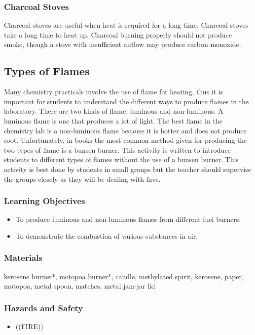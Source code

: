 \subsubsection{Charcoal Stoves}

Charcoal stoves are useful when heat is required for a long time. Charcoal stoves take a long time to heat up. Charcoal burning properly should not produce smoke, though a stove with insufficient airflow may produce carbon monoxide.

\subsection{Types of Flames}
Many chemistry practicals involve the use of flame for heating, thus it is important for students to understand the different ways to produce flames in the laboratory. There are two kinds of flame: luminous and non-luminous. A luminous flame is one that produces a lot of light. The best flame in the chemistry lab is a non-luminous flame because it is hotter and does not produce soot. Unfortunately, in books the most common method given for producing the two types of flame is a bunsen burner. This activity is written to introduce students to different types of flames without the use of a bunsen burner. This activity is best done by students in small groups but the teacher should supervise the groups closely as they will be dealing with fires.
\subsubsection*{Learning Objectives}
\begin{itemize}
\item{To produce luminous and non-luminous flames from different fuel burners.}
\item{To demonstrate the combustion of various substances in air.}
\end{itemize}

\subsubsection*{Materials}
kerosene burner*, motopoa burner*, candle,  methylated spirit, kerosene, paper, motopoa, metal spoon, matches, metal jam-jar lid

\subsubsection*{Hazards and Safety}
\begin{itemize}
\item{((FIRE))}
\end{itemize}

